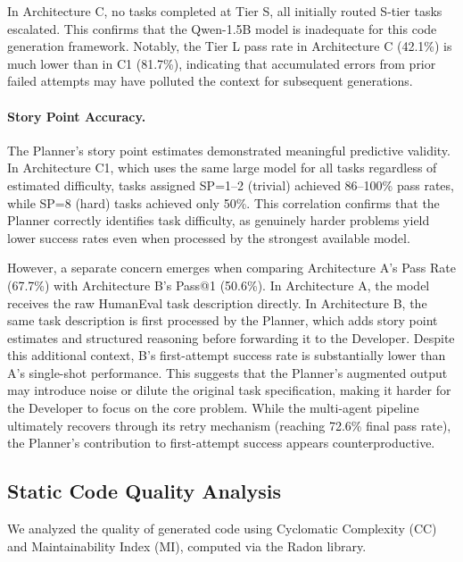 In Architecture C, no tasks completed at Tier S, all initially routed S-tier tasks escalated. This confirms that the Qwen-1.5B model is inadequate for this code generation framework. Notably, the Tier L pass rate in Architecture C (42.1\%) is much lower than in C1 (81.7\%), indicating that accumulated errors from prior failed attempts may have polluted the context for subsequent generations.

\paragraph{Story Point Accuracy.}
The Planner's story point estimates demonstrated meaningful predictive validity. In Architecture C1, which uses the same large model for all tasks regardless of estimated difficulty, tasks assigned SP=1--2 (trivial) achieved 86--100\% pass rates, while SP=8 (hard) tasks achieved only 50\%. This correlation confirms that the Planner correctly identifies task difficulty, as genuinely harder problems yield lower success rates even when processed by the strongest available model.

However, a separate concern emerges when comparing Architecture A's Pass Rate (67.7\%) with Architecture B's Pass@1 (50.6\%). In Architecture A, the model receives the raw HumanEval task description directly. In Architecture B, the same task description is first processed by the Planner, which adds story point estimates and structured reasoning before forwarding it to the Developer. Despite this additional context, B's first-attempt success rate is substantially lower than A's single-shot performance. This suggests that the Planner's augmented output may introduce noise or dilute the original task specification, making it harder for the Developer to focus on the core problem. While the multi-agent pipeline ultimately recovers through its retry mechanism (reaching 72.6\% final pass rate), the Planner's contribution to first-attempt success appears counterproductive.
\subsection{Static Code Quality Analysis}
\label{subsec:code_quality}

We analyzed the quality of generated code using Cyclomatic Complexity (CC) and Maintainability Index (MI), computed via the Radon library.

